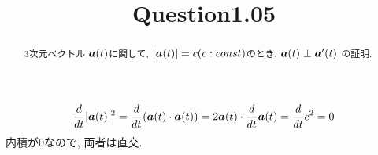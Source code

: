 \documentclass{jsarticle}
\title{Question1.05}
\newcommand*{\mbold}[1]{\mbox{\boldmath $#1$}}
\begin{document}
\maketitle

\begin{abstract}
  3次元ベクトル $\mbold{a}(t)$に関して, $|\mbold{a}(t)| = c (c:const)$のとき, 
  $\mbold{a}(t) \perp \mbold{a}^\prime(t)$
  の証明. 
\end{abstract}

\begin{equation}
  \frac{d}{dt}|\mbold{a}(t)|^2 = \frac{d}{dt}(\mbold{a}(t) \cdot \mbold{a}(t))
  = 2 \mbold{a}(t) \cdot \frac{d}{dt}\mbold{a}(t) = \frac{d}{dt}c^2 = 0
\end{equation}
内積が0なので, 両者は直交. 
\end{document}
